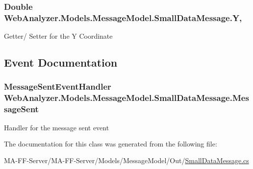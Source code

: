 \subsubsection[{Y}]{\setlength{\rightskip}{0pt plus 5cm}Double Web\+Analyzer.\+Models.\+Message\+Model.\+Small\+Data\+Message.\+Y\hspace{0.3cm}{\ttfamily [get]}, {\ttfamily [set]}}\label{class_web_analyzer_1_1_models_1_1_message_model_1_1_small_data_message_a4214bf4d6c2c88448e32472cc14f41cd}


Getter/ Setter for the Y Coordinate 



\subsection{Event Documentation}
\hypertarget{class_web_analyzer_1_1_models_1_1_message_model_1_1_small_data_message_a818b24f7d28ba31b0db960023181ed68}{}
\subsubsection[{Message\+Sent}]{\setlength{\rightskip}{0pt plus 5cm}Message\+Sent\+Event\+Handler Web\+Analyzer.\+Models.\+Message\+Model.\+Small\+Data\+Message.\+Message\+Sent}\label{class_web_analyzer_1_1_models_1_1_message_model_1_1_small_data_message_a818b24f7d28ba31b0db960023181ed68}


Handler for the message sent event 



The documentation for this class was generated from the following file\+:\begin{DoxyCompactItemize}
\item 
M\+A-\/\+F\+F-\/\+Server/\+M\+A-\/\+F\+F-\/\+Server/\+Models/\+Message\+Model/\+Out/\hyperlink{_small_data_message_8cs}{Small\+Data\+Message.\+cs}\end{DoxyCompactItemize}
